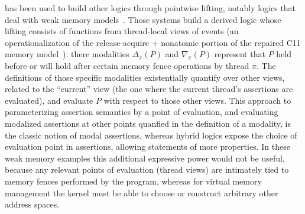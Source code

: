 
\iris has been used to build other logics through pointwise lifting, notably logics that deal with weak
memory models~\cite{dang2019rustbelt,dang2022compass}. Those systems build a derived logic
whose lifting consists of functions from thread-local views of events (an operationalization of the release-acquire + nonatomic
portion of the repaired C11 memory model~\cite{lahav2017repairing}): there modalities $\Delta_\pi(P)$ and $\nabla_\pi(P)$
represent that $P$ held before or will hold after certain memory fence operations by thread $\pi$.
The definitions of those specific modalities existentially quantify over other views, related to the ``current'' view (the one where
the current thread's assertions are evaluated), and evaluate $P$ with respect to those other views. This approach to parameterizing
assertion semantics by a point of evaluation, and evaluating modalized assertions at other points quanfied in the definition of a modality,
is the classic notion of modal assertions, whereas hybrid logics expose the choice of evaluation point in assertions,
allowing statements of more properties. In these weak memory examples this additional expressive power would not be useful,
because any relevant points of evaluation (thread views) are intimately tied to memory fences performed by the program, whereas
for virtual memory management the kernel must be able to choose or construct arbitrary other address spaces.

